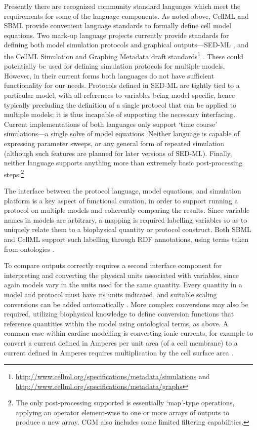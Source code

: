 \documentclass[preprint,authoryear,12pt]{elsarticle}
\newcommand{\changed}[1]{#1}
\begin{document}
Presently there are \changed{recognized community standard} languages which meet the requirements for some of the language components.
As noted above, CellML and SBML provide convenient language standards to formally define cell model equations.
Two mark-up language projects \changed{currently provide} standards for defining both model simulation protocols and graphical outputs\changed{---SED-ML \citep{SED-ML.08}, and the CellML Simulation and Graphing Metadata draft standards\footnote{\url{http://www.cellml.org/specifications/metadata/simulations} and \url{http://www.cellml.org/specifications/metadata/graphs}} \citep[CSM and CGM respectively; used in][for example]{Nickerson&Buist.09:physiome}.
These could potentially} be used for defining simulation protocols for multiple models.
\changed{However, in their current forms both languages do not have sufficient functionality for our needs.
Protocols defined in SED-ML are tightly tied to a particular model, with all references to variables being model specific, hence typically precluding the definition of a single protocol that can be applied to multiple models; it is thus incapable of supporting the necessary interfacing.
Current implementations of both languages only support `time course' simulations---a single solve of model equations.
Neither language is capable of expressing parameter sweeps, or any general form of repeated simulation (although such features are planned for later versions of SED-ML).
Finally, neither language supports anything more than extremely basic post-processing steps.}\footnote{The only post-processing supported is essentially `map'-type operations, applying an operator element-wise to one or more arrays of outputs to produce a new array. CGM also includes some limited filtering capabilities.}



The interface between the protocol language, model equations, and simulation platform is a key aspect of functional curation, in order to support running a protocol on multiple models and coherently comparing the results.
Since variable names in models are arbitrary, a mapping is required labelling variables so as to uniquely relate them to a biophysical quantity or protocol construct.
Both SBML and CellML support such labelling through RDF annotations, using terms taken from ontologies \citep{Novere&Finney.05:simple,Beard*.09:CellML}.


To compare outputs correctly requires a second interface component for interpreting and converting the physical units associated with variables, since again models vary in the units used for the same quantity.
Every quantity in a model and protocol must have its units indicated, and suitable scaling conversions can be added automatically \citep{Cooper&McKeever.07:Model-driven}.
More complex conversions may also be required, utilizing biophysical knowledge to define conversion functions that reference quantities within the model using ontological terms, as above.
A common case within cardiac modelling is converting ionic currents, for example to convert a current defined in Amperes per unit area (of a cell membrane) to a current defined in Amperes requires multiplication by the cell surface area \citep{Cooper*.11:Considerations}.
\end{document}
